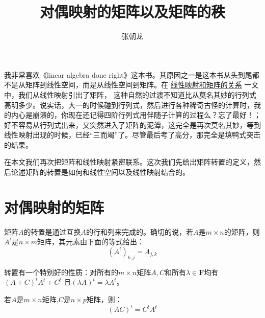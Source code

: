 \documentclass[10pt,a4paper,UTF8]{article}
\author{张朝龙}
\date{}
\title{对偶映射的矩阵以及矩阵的秩}
\begin{document}
\maketitle
\tableofcontents
{}
我非常喜欢《linear algebra done right》这本书。其原因之一是这本书从头到尾都不是从矩阵到线性空间，而是从线性空间到矩阵。在 \href{matrix-for-linear-map.org}{线性映射和矩阵的关系} 一文中，我们从线性映射引出了矩阵， 这种自然的过渡不知道比从莫名其妙的行列式高明多少。说实话，大一的时候碰到行列式，然后进行各种稀奇古怪的计算时，我的内心是崩溃的，你现在还记得四阶行列式用伴随子计算的过程么？忘了最好！；好不容易从行列式出来，又突然进入了矩阵的泥潭，这完全是再次莫名其妙，等到线性映射出现的时候，已经“三而竭”了。尽管最后考了高分，那完全是填鸭式突击的结果。

在本文我们再次把矩阵和线性映射紧密联系。这次我们先给出矩阵转置的定义，然后论述矩阵的转置是如何和线性空间以及线性映射结合的。

\section{对偶映射的矩阵}
\label{sec:org1a17dc2}

\begin{definition}
矩阵\(A\)的转置是通过互换\(A\)的行和列来完成的。确切的说，若\(A\)是\(m\times n\)的矩阵，则\(A^{t}\)是\(n\times m\)矩阵，其元素由下面的等式给出：
\[(A^{t})_{k,j} = A_{j,k}\]
\end{definition}

转置有一个特别好的性质：对所有的\(m\times n\)矩阵\(A,C\)和所有\(\lambda\in \mathbf{F}\)均有\((A+C)^{t} A^{t} + C^{t}\) 且\((\lambda A)^{t} = \lambda A^{t}\)。

\begin{theorem}
若\(A\)是\(m\times n\)矩阵,\(C\)是\(n\times p\)矩阵，则：\[(AC)^{t} = C^{t}A^{t}\]
\end{theorem}
\end{document}
